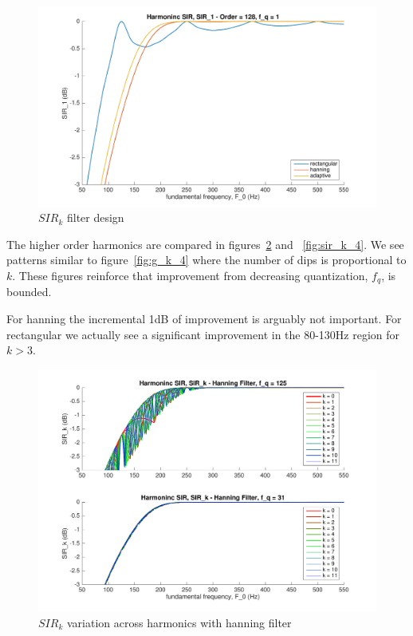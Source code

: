 \documentclass [11pt, proquest,oneside] {uwthesis}[2015/03/03]
\begin{document}
\begin{figure}[!ht]
  \centering
    \includegraphics[width=1\textwidth]{sir_k_2}
    \caption{$SIR_k$ filter design}\label{fig:sir_k_2}
\end{figure}

The higher order harmonics are compared in figures~\ref{fig:sir_k_3} and ~\ref{fig:sir_k_4}.  We see patterns similar to figure~\ref{fig:g_k_4} where the number of dips is proportional to $k$.  These figures reinforce that improvement from decreasing quantization, $f_q$, is bounded.

For hanning the incremental 1dB of improvement is arguably not important.  For rectangular we actually see a significant improvement in the 80-130Hz region for $k > 3$.

\begin{figure}[!ht]
  \centering
    \includegraphics[width=1\textwidth]{sir_k_3}
    \caption{$SIR_k$ variation across harmonics with hanning filter}\label{fig:sir_k_3}
\end{figure}
\end{document}

